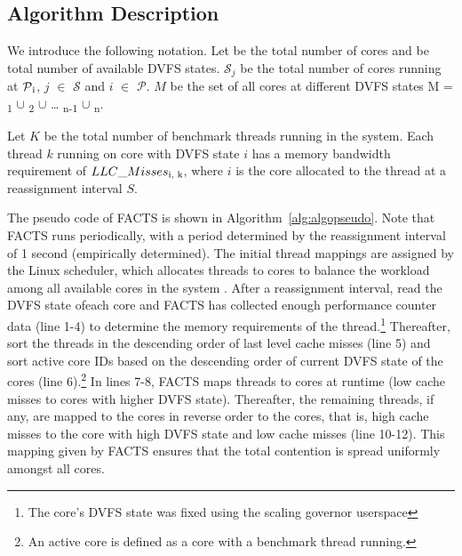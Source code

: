 \subsection{Algorithm Description}
\label{subsec: FACTS algo}


 We introduce the following notation. Let \mathcalS be the total number of cores and
\mathcalP be total number of available DVFS states. $\mathcal S_{j}$ be the total number
of cores running at $\mathcal P\textsubscript{i}$, $j$ $\in$ $\mathcal S$ and $i$ $\in$
$\mathcal P$. $M$ be the set of all cores at different DVFS states M =
\mathcalS\textsubscript{1} $\cup$ \mathcalS\textsubscript{2} $\cup$ \ldots
\mathcalS\textsubscript{n-1} $\cup$ \mathcalS\textsubscript{n}. 

 Let $K$ be the total number of benchmark threads running in the system. Each
thread $k$ running on core with DVFS state  $i$ has a memory bandwidth requirement of
$LLC\_Misses\textsubscript{i, k}$, where $i$ is the core allocated to the thread at a
reassignment interval $S$.


 The pseudo code of FACTS is shown in Algorithm~\ref{alg:algopseudo}. Note that FACTS runs
periodically, with a period determined by the reassignment interval of 1 second
(empirically determined). The initial thread mappings are assigned by the Linux scheduler,
which allocates threads to cores to balance the workload among all available cores in the
system \citep{LinuxKernel}. After a reassignment interval, read the DVFS state ofeach
core and
FACTS has collected enough performance counter data (line 1-4) to determine the memory
requirements of the thread.\footnote{The core's DVFS state was fixed using the scaling governor userspace}
Thereafter, sort the threads in the descending order of last
level cache misses (line 5) and sort active core
IDs based on the descending order of current DVFS
state of the cores (line 6).\footnote{An active core is defined as a core with a benchmark thread running.} 
In lines 7-8, FACTS maps threads to cores at runtime (low cache
misses to cores with higher DVFS state). Thereafter, the remaining threads, if any, are
mapped to the cores in reverse order to the cores, that is, high cache misses to the core
with high DVFS state and low cache misses (line 10-12). This mapping given by FACTS
ensures that the total contention is spread uniformly amongst all cores. 



